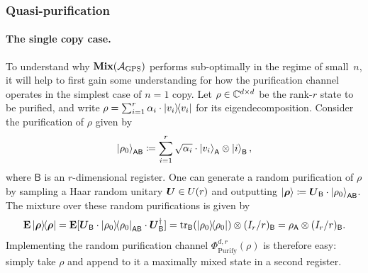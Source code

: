 \documentclass{article}
\newcommand{\mixed}{\textup{\textbf{Mix}}}
\newcommand{\gps}{\calA_{\mathrm{GPS}}}
\newcommand{\purifychan}{\Phi_{\mathrm{Purify}}}
\newcommand{\reg}[1]{\mathsf{#1}}
\begin{document}
\subsubsection{Quasi-purification}

\paragraph{The single copy case.}
To understand why $\mixed(\gps)$ performs sub-optimally in the regime of small~$n$,
it will help to first gain some understanding for how the purification channel operates in the simplest case of $n = 1$ copy.
Let $\rho \in \mathbb C^{d \times d}$ be the rank-$r$ state to be purified,
and write $\rho = \sum_{i=1}^r \alpha_i \cdot \ketbra{v_i}$ for its eigendecomposition.
Consider the purification of $\rho$ given by
\begin{equation*}
    \ket{\rho_0}_{\reg{A}\reg{B}} \coloneqq \sum_{i=1}^r \sqrt{\alpha_i} \cdot \ket{v_i}_{\reg{A}} \otimes \ket{i}_{\reg{B}},
\end{equation*}
where  $\reg{B}$ is an $r$-dimensional register.
One can generate a random purification of $\rho$ by sampling a Haar random unitary $\boldsymbol{U} \in U(r)$
and outputting $\ket{\brho} \coloneqq \bU_{\reg{B}} \cdot \ket{\rho_0}_{\reg{A} \reg{B}}$.
The mixture over these random purifications is given by
\begin{equation}\label{eq:append-a-reg}
    \E \ketbra{\brho} = \E[\bU_{\reg{B}} \cdot \ketbra{\rho_0}_{\reg{A} \reg{B}} \cdot \bU_{\reg{B}}^{\dagger}]
    = \tr_{\reg{B}}(\ketbra{\rho_0}) \otimes (I_r/r)_{\reg{B}}
    = \rho_{\reg{A}} \otimes (I_r/r)_{\reg{B}}.
\end{equation}
Implementing the random purification channel $\purifychan^{d,r}(\rho)$ is therefore easy: simply take $\rho$ and append to it a maximally mixed state in a second register.
\end{document}
